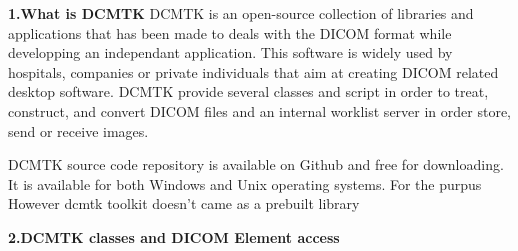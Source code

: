 \textbf{1.What is DCMTK}
\newline
DCMTK is an open-source collection of libraries and applications that has been made to  deals with the DICOM format while developping an independant application. This software is widely used by hospitals, companies or private individuals that aim at creating DICOM related desktop software. DCMTK provide several classes and script in order to treat, construct, and convert DICOM files and an internal worklist server in order store, send or receive images.

\newline
DCMTK source code repository is available on Github and free for downloading. It is available for both Windows and Unix operating systems. For the purpus
 However dcmtk toolkit doesn't came as a prebuilt library 


\clearpage
\textbf{2.DCMTK classes and DICOM Element access}